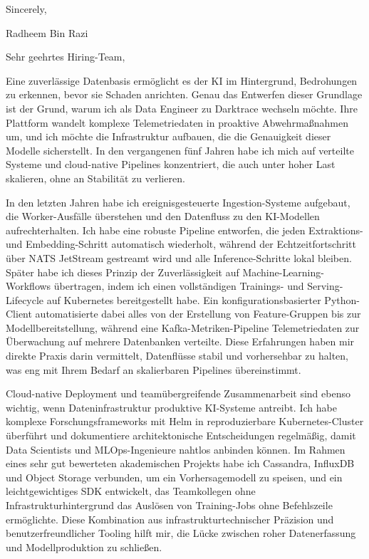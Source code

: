 \documentclass[11pt,a4paper]{coverletter}
\begin{document}
\closing{Sincerely,}{Radheem Bin Razi}

\clearpage
{}


\opening{Sehr geehrtes Hiring-Team,}

Eine zuverlässige Datenbasis ermöglicht es der KI im Hintergrund, Bedrohungen zu erkennen, bevor sie Schaden anrichten. Genau das Entwerfen dieser Grundlage ist der Grund, warum ich als Data Engineer zu Darktrace wechseln möchte. Ihre Plattform wandelt komplexe Telemetriedaten in proaktive Abwehrmaßnahmen um, und ich möchte die Infrastruktur aufbauen, die die Genauigkeit dieser Modelle sicherstellt. In den vergangenen fünf Jahren habe ich mich auf verteilte Systeme und cloud-native Pipelines konzentriert, die auch unter hoher Last skalieren, ohne an Stabilität zu verlieren.

In den letzten Jahren habe ich ereignisgesteuerte Ingestion-Systeme aufgebaut, die Worker-Ausfälle überstehen und den Datenfluss zu den KI-Modellen aufrechterhalten. Ich habe eine robuste Pipeline entworfen, die jeden Extraktions- und Embedding-Schritt automatisch wiederholt, während der Echtzeitfortschritt über NATS JetStream gestreamt wird und alle Inference-Schritte lokal bleiben. Später habe ich dieses Prinzip der Zuverlässigkeit auf Machine-Learning-Workflows übertragen, indem ich einen vollständigen Trainings- und Serving-Lifecycle auf Kubernetes bereitgestellt habe. Ein konfigurationsbasierter Python-Client automatisierte dabei alles von der Erstellung von Feature-Gruppen bis zur Modellbereitstellung, während eine Kafka-Metriken-Pipeline Telemetriedaten zur Überwachung auf mehrere Datenbanken verteilte. Diese Erfahrungen haben mir direkte Praxis darin vermittelt, Datenflüsse stabil und vorhersehbar zu halten, was eng mit Ihrem Bedarf an skalierbaren Pipelines übereinstimmt.

Cloud-native Deployment und teamübergreifende Zusammenarbeit sind ebenso wichtig, wenn Dateninfrastruktur produktive KI-Systeme antreibt. Ich habe komplexe Forschungsframeworks mit Helm in reproduzierbare Kubernetes-Cluster überführt und dokumentiere architektonische Entscheidungen regelmäßig, damit Data Scientists und MLOps-Ingenieure nahtlos anbinden können. Im Rahmen eines sehr gut bewerteten akademischen Projekts habe ich Cassandra, InfluxDB und Object Storage verbunden, um ein Vorhersagemodell zu speisen, und ein leichtgewichtiges SDK entwickelt, das Teamkollegen ohne Infrastrukturhintergrund das Auslösen von Training-Jobs ohne Befehlszeile ermöglichte. Diese Kombination aus infrastrukturtechnischer Präzision und benutzerfreundlicher Tooling hilft mir, die Lücke zwischen roher Datenerfassung und Modellproduktion zu schließen.
\end{document}
